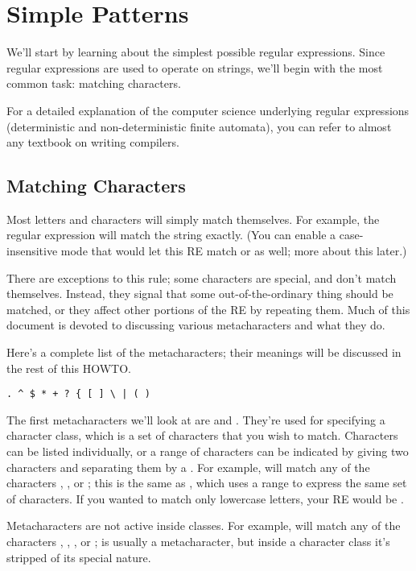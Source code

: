 \documentclass{howto}
\begin{document}
\section{Simple Patterns}

We'll start by learning about the simplest possible regular
expressions.  Since regular expressions are used to operate on
strings, we'll begin with the most common task: matching characters.

For a detailed explanation of the computer science underlying regular
expressions (deterministic and non-deterministic finite automata), you
can refer to almost any textbook on writing compilers.

\subsection{Matching Characters}

Most letters and characters will simply match themselves.  For
example, the regular expression  will match the string
 exactly.  (You can enable a case-insensitive mode that
would let this RE match  or  as well; more
about this later.)  

There are exceptions to this rule; some characters are
special, and don't match themselves.  Instead, they signal that some
out-of-the-ordinary thing should be matched, or they affect other
portions of the RE by repeating them.  Much of this document is
devoted to discussing various metacharacters and what they do.

Here's a complete list of the metacharacters; their meanings will be
discussed in the rest of this HOWTO.

\begin{verbatim}
. ^ $ * + ? { [ ] \ | ( )
\end{verbatim}

The first metacharacters we'll look at are \samp{[} and \samp{]}.
They're used for specifying a character class, which is a set of
characters that you wish to match.  Characters can be listed
individually, or a range of characters can be indicated by giving two
characters and separating them by a \character{-}.  For example,
\regexp{[abc]} will match any of the characters , , or
; this is the same as
\regexp{[a-c]}, which uses a range to express the same set of
characters.  If you wanted to match only lowercase letters, your
RE would be \regexp{[a-z]}.

Metacharacters are not active inside classes.  For example,
\regexp{[akm\$]} will match any of the characters ,
, , or \character{\$}; \character{\$} is
usually a metacharacter, but inside a character class it's stripped of
its special nature.
\end{document}
